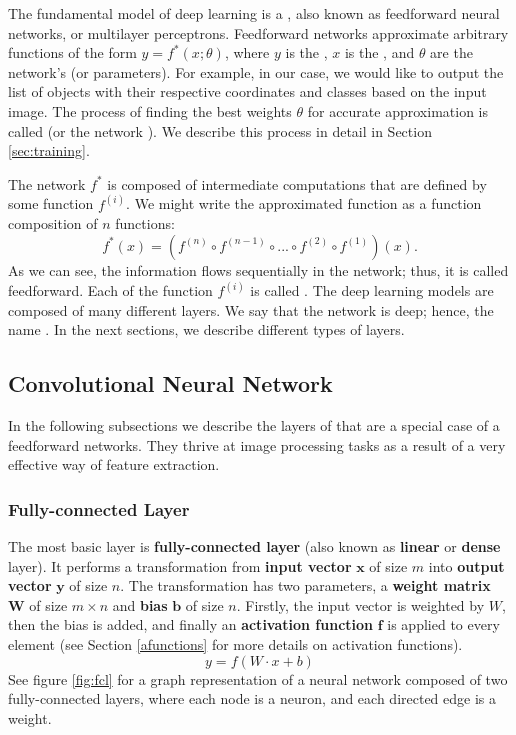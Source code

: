 The fundamental model of deep learning is a , also known as feedforward neural networks, or multilayer perceptrons. Feedforward networks approximate arbitrary functions of the form $y = f^*(x;\theta)$, where $y$ is the , $x$ is the , and $\theta$ are the network's  (or parameters). For example, in our case, we would like to output the list of objects with their respective coordinates and classes based on the input image. The process of finding the best weights $\theta$ for accurate approximation is called  (or the network ). We describe this process in detail in Section \ref{sec:training}.

The network $f^*$ is composed of intermediate computations that are defined by some function $f^{(i)}$. We might write the approximated function as a function composition of $n$ functions: 
$$
f^*(x) = (f^{(n)} \circ f^{(n-1)} \circ ... \circ f^{(2)} \circ f^{(1)})(x).
$$
As we can see, the information flows sequentially in the network; thus, it is called feedforward. Each of the function $f^{(i)}$ is called . The deep learning models are composed of many different layers. We say that the network is deep; hence, the name . In the next sections, we describe different types of layers.



\subsection{Convolutional Neural Network}
In the following subsections we describe the layers of  that are a special case of a feedforward networks. They thrive at image processing tasks as a result of a very effective way of feature extraction.

\subsubsection{Fully-connected Layer}
The most basic layer is \textbf{fully-connected layer} (also known as \textbf{linear} or \textbf{dense} layer). It performs a transformation from \textbf{input vector} $\boldsymbol{x}$ of size $m$ into \textbf{output vector} $\boldsymbol{y}$ of size $n$. The transformation has two parameters, a \textbf{weight matrix} $\boldsymbol{W}$ of size $m \times n$ and \textbf{bias} $\boldsymbol{b}$ of size $n$. Firstly, the input vector is weighted by $W$, then the bias is added, and finally an \textbf{activation function} $\boldsymbol{f}$ is applied to every element (see Section \ref{afunctions} for more details on activation functions).
$$
y = f(W\cdot x + b)
$$
See figure \ref{fig:fcl} for a graph representation of a neural network composed of two fully-connected layers, where each node is a neuron, and each directed edge is a weight.


